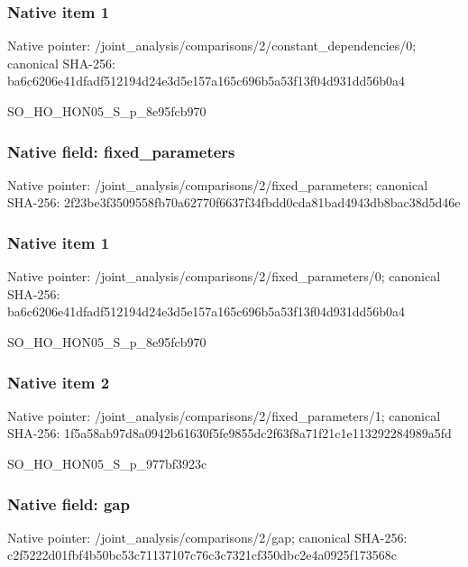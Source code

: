 \documentclass[10pt,a4paper]{article}
\begin{document}
\subsubsection{Native item 1}
Native pointer: /joint\_\allowbreak{}analysis/comparisons/2/constant\_\allowbreak{}dependencies/0; canonical SHA-256: ba6c6206e41dfadf512194d24e3d5e157a165c696b5a53f13f04d931dd56b0a4

\begingroup\raggedright\sloppy SO\_\allowbreak{}HO\_\allowbreak{}HON05\_\allowbreak{}S\_\allowbreak{}p\_\allowbreak{}8e95fcb970\par\endgroup

\subsubsection{Native field: fixed\_\allowbreak{}parameters}
Native pointer: /joint\_\allowbreak{}analysis/comparisons/2/fixed\_\allowbreak{}parameters; canonical SHA-256: 2f23be3f3509558fb70a62770f6637f34fbdd0cda81bad4943db8bac38d5d46e

\subsubsection{Native item 1}
Native pointer: /joint\_\allowbreak{}analysis/comparisons/2/fixed\_\allowbreak{}parameters/0; canonical SHA-256: ba6c6206e41dfadf512194d24e3d5e157a165c696b5a53f13f04d931dd56b0a4

\begingroup\raggedright\sloppy SO\_\allowbreak{}HO\_\allowbreak{}HON05\_\allowbreak{}S\_\allowbreak{}p\_\allowbreak{}8e95fcb970\par\endgroup

\subsubsection{Native item 2}
Native pointer: /joint\_\allowbreak{}analysis/comparisons/2/fixed\_\allowbreak{}parameters/1; canonical SHA-256: 1f5a58ab97d8a0942b61630f5fe9855dc2f63f8a71f21c1e113292284989a5fd

\begingroup\raggedright\sloppy SO\_\allowbreak{}HO\_\allowbreak{}HON05\_\allowbreak{}S\_\allowbreak{}p\_\allowbreak{}977bf3923c\par\endgroup

\subsubsection{Native field: gap}
Native pointer: /joint\_\allowbreak{}analysis/comparisons/2/gap; canonical SHA-256: c2f5222d01fbf4b50bc53c71137107c76c3c7321cf350dbc2e4a0925f173568c
\end{document}
